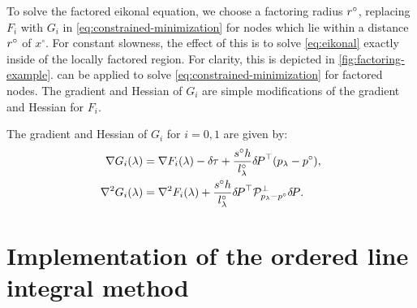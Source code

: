 \documentclass{article}
\begin{document}
To solve the factored eikonal equation, we choose a factoring radius
$r^\circ$, replacing $F_i$ with $G_i$ in
\cref{eq:constrained-minimization} for nodes which lie within a
distance $r^\circ$ of $x^\circ$. For constant slowness, the effect of
this is to solve \cref{eq:eikonal} exactly inside of the locally
factored region. For clarity, this is depicted in
\cref{fig:factoring-example}.  can be applied to
solve \cref{eq:constrained-minimization} for factored nodes. The
gradient and Hessian of $G_i$ are simple modifications of the gradient
and Hessian for $F_i$.

\begin{lemma}
  The gradient and Hessian of $G_i$ for $i = 0, 1$ are given
  by:
  \begin{align}
    \label{eq:G-grad-hess}
    \nabla G_i(\lambda) &= \nabla F_i(\lambda) - {\delta \hspace{-0.05em} \tau} + \frac{s^\circ h}{l^\circ_\lambda} {\delta \hspace{-0.14em} P}^\top {(p_\lambda - p^\circ)}, \\
    \nabla^2 G_i(\lambda) &= \nabla^2 F_i(\lambda) + \frac{s^\circ h}{l^\circ_\lambda} {\delta \hspace{-0.14em} P}^\top \mathcal{P}^\perp_{p_\lambda - p^\circ} {\delta \hspace{-0.14em} P}.
  \end{align}
\end{lemma}

\section{Implementation of the ordered line integral
  method}\label{sec:implementation}
\end{document}
